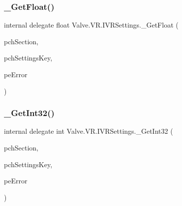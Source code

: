 \mbox{\label{struct_valve_1_1_v_r_1_1_i_v_r_settings_a56022255db980ce1cdb32396f706c8b7}} 
\subsubsection{\texorpdfstring{\_GetFloat()}{\_GetFloat()}}
{\footnotesize\ttfamily internal delegate float Valve.\+V\+R.\+I\+V\+R\+Settings.\+\_\+\+Get\+Float (\begin{DoxyParamCaption}\item[{string}]{pch\+Section,  }\item[{string}]{pch\+Settings\+Key,  }\item[{ref \mbox{\hyperlink{namespace_valve_1_1_v_r_aeab7722b211afc3885ed77faa931291f}{E\+V\+R\+Settings\+Error}}}]{pe\+Error }\end{DoxyParamCaption})}

\mbox{\label{struct_valve_1_1_v_r_1_1_i_v_r_settings_a8477f6872b134bfeb56540d1f1945230}} 
\subsubsection{\texorpdfstring{\_GetInt32()}{\_GetInt32()}}
{\footnotesize\ttfamily internal delegate int Valve.\+V\+R.\+I\+V\+R\+Settings.\+\_\+\+Get\+Int32 (\begin{DoxyParamCaption}\item[{string}]{pch\+Section,  }\item[{string}]{pch\+Settings\+Key,  }\item[{ref \mbox{\hyperlink{namespace_valve_1_1_v_r_aeab7722b211afc3885ed77faa931291f}{E\+V\+R\+Settings\+Error}}}]{pe\+Error }\end{DoxyParamCaption})}

\mbox{\label{struct_valve_1_1_v_r_1_1_i_v_r_settings_a04ee1d90a6a44d0e51d2a78055ca775c}} 
